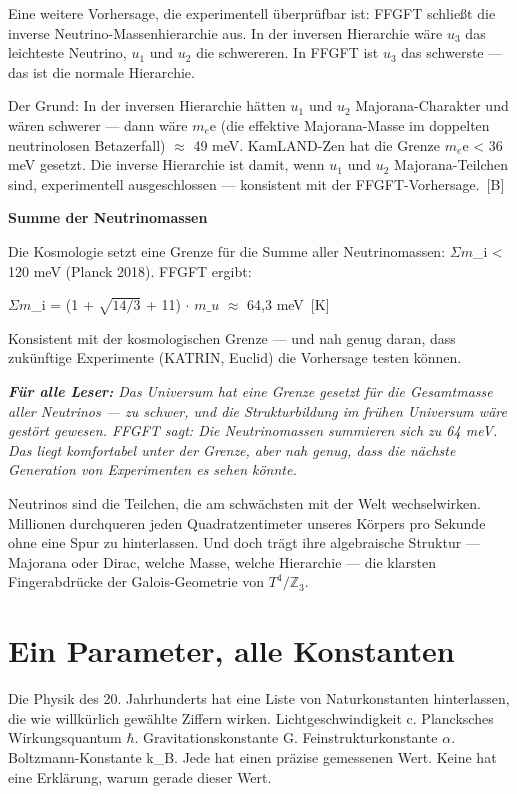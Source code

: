 \documentclass[11pt,oneside]{book}
\newcommand{\status}[1]{\penalty10000\,{\scriptsize\textcolor{gray!60}{[#1]}}}
\newenvironment{laierspur}{%
  \par\vspace{4pt}%
  \noindent\small\itshape\color{blue!60!black}%
  \textbf{Für alle Leser:}\enspace\ignorespaces}{%
  \par\vspace{4pt}\normalsize\normalfont\normalcolor}
\begin{document}
Eine weitere Vorhersage, die experimentell überprüfbar ist: FFGFT schließt
die inverse Neutrino-Massenhierarchie aus. In der inversen Hierarchie wäre
$
u_3$ das leichteste Neutrino, $
u_1$ und $
u_2$ die schwereren. In FFGFT ist $
u_3$
das schwerste — das ist die normale Hierarchie.


Der Grund: In der inversen Hierarchie hätten $
u_1$ und $
u_2$ Majorana-Charakter
und wären schwerer — dann wäre $m_e$e (die effektive Majorana-Masse im
doppelten neutrinolosen Betazerfall) $\approx$ 49 meV. KamLAND-Zen hat die Grenze
$m_e$e < 36 meV gesetzt. Die inverse Hierarchie ist damit, wenn $
u_1$ und $
u_2$
Majorana-Teilchen sind, experimentell ausgeschlossen — konsistent mit
der FFGFT-Vorhersage. \status{B}


\textbf{Summe der Neutrinomassen}


Die Kosmologie setzt eine Grenze für die Summe aller Neutrinomassen:
$\Sigma m$\_i < 120 meV (Planck 2018). FFGFT ergibt:


$\Sigma m$\_i = (1 + $\sqrt{14/3}$ + 11) $\cdot$ $m\_
u$ $\approx$ 64,3 meV \status{K}


Konsistent mit der kosmologischen Grenze — und nah genug daran, dass
zukünftige Experimente (KATRIN, Euclid) die Vorhersage testen können.


\begin{laierspur}
Das Universum hat eine Grenze gesetzt für die Gesamtmasse
aller Neutrinos — zu schwer, und die Strukturbildung im frühen Universum
wäre gestört gewesen. FFGFT sagt: Die Neutrinomassen summieren sich zu
64 meV. Das liegt komfortabel unter der Grenze, aber nah genug, dass
die nächste Generation von Experimenten es sehen könnte.
\end{laierspur}

Neutrinos sind die Teilchen, die am schwächsten mit der Welt wechselwirken.
Millionen durchqueren jeden Quadratzentimeter unseres Körpers pro Sekunde
ohne eine Spur zu hinterlassen. Und doch trägt ihre algebraische Struktur
— Majorana oder Dirac, welche Masse, welche Hierarchie — die klarsten
Fingerabdrücke der Galois-Geometrie von $T^4/\mathbb{Z}_3$.








\chapter{Ein Parameter, alle Konstanten}

Die Physik des 20. Jahrhunderts hat eine Liste von Naturkonstanten
hinterlassen, die wie willkürlich gewählte Ziffern wirken. Lichtgeschwindigkeit
c. Plancksches Wirkungsquantum $\hbar$. Gravitationskonstante G. Feinstrukturkonstante
$\alpha$. Boltzmann-Konstante k\_B. Jede hat einen präzise gemessenen Wert. Keine
hat eine Erklärung, warum gerade dieser Wert.
\end{document}
